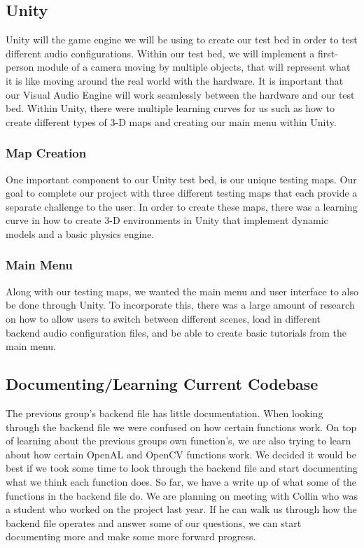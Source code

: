 \documentclass{scrreprt}
\begin{document}
\subsection{Unity}
Unity will the game engine we will be using to create our test bed in order to test different audio configurations. Within our test bed, we will implement a first-person module of a camera moving by multiple objects, that will represent what it is like moving around the real world with the hardware. It is important that our Visual Audio Engine will work seamlessly between the hardware and our test bed. Within Unity, there were multiple learning curves for us such as how to create different types of 3-D maps and creating our main menu within Unity.

\subsubsection{Map Creation}
One important component to our Unity test bed, is our unique testing maps. Our goal to complete our project with three different testing maps that each provide a separate challenge to the user. In order to create these maps, there was a learning curve in how to create 3-D environments in Unity that implement dynamic models and a basic physics engine.

\subsubsection{Main Menu}
Along with our testing maps, we wanted the main menu and user interface to also be done through Unity. To incorporate this, there was a large amount of research on how to allow users to switch between different scenes, load in different backend audio configuration files, and be able to create basic tutorials from the main menu.

\subsection{Documenting/Learning Current Codebase}
The previous group's backend file has little documentation. When looking through the backend file we were confused on how certain functions work. On top of learning about the previous groups own function's, we are also trying to learn about how certain OpenAL and OpenCV functions work. We decided it would be best if we took some time to look through the backend file and start documenting what we think each function does. So far, we have a write up of what some of the functions in the backend file do. We are planning on meeting with Collin who was a student who worked on the project last year. If he can walk us through how the backend file operates and answer some of our questions, we can start documenting more and make some more forward progress.
\end{document}
